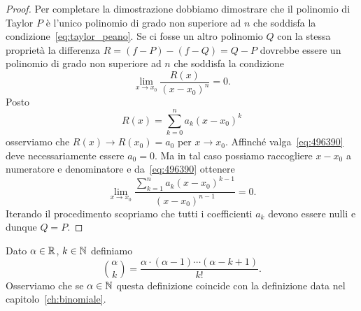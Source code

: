 \begin{proof}
Per completare la dimostrazione dobbiamo dimostrare che il polinomio di 
Taylor $P$ è l'unico polinomio di grado non superiore ad $n$ che soddisfa 
la condizione~\eqref{eq:taylor_peano}.
Se ci fosse un altro polinomio $Q$ con la stessa proprietà la differenza 
$R=(f-P)-(f-Q)=Q-P$ dovrebbe essere un polinomio di grado 
non superiore ad $n$ che soddisfa la condizione 
\begin{equation}\label{eq:496390}
  \lim_{x\to x_0}\frac{R(x)}{(x-x_0)^n}=0.  
\end{equation}
Posto 
\[
  R(x) = \sum_{k=0}^n a_k (x-x_0)^k  
\]
osserviamo che $R(x)\to R(x_0) = a_0$ per $x\to x_0$. 
Affinché valga~\eqref{eq:496390} deve necessariamente 
essere $a_0 = 0$.
Ma in tal caso possiamo raccogliere $x-x_0$ a numeratore 
e denominatore e da~\eqref{eq:496390} ottenere 
\[
  \lim_{x\to x_0}\frac{\sum_{k=1}^n a_k (x-x_0)^{k-1}}{(x-x_0)^{n-1}}=0.  
\]
Iterando il procedimento scopriamo che tutti i coefficienti $a_k$ 
devono essere nulli e dunque $Q=P$.
\end{proof}

\begin{definition}
\label{def:binomiale_reale}%
\mymark{***}%
Dato $\alpha \in {\mathbb R}$, $k \in {\mathbb N}$ definiamo
\[
 {\alpha \choose k } = \frac{\alpha \cdot (\alpha-1) \cdots (\alpha -k +1)}{k!}.
\]
Osserviamo che se $\alpha \in {\mathbb N}$ questa definizione coincide
con la definizione data nel capitolo~\ref{ch:binomiale}.
\end{definition}

